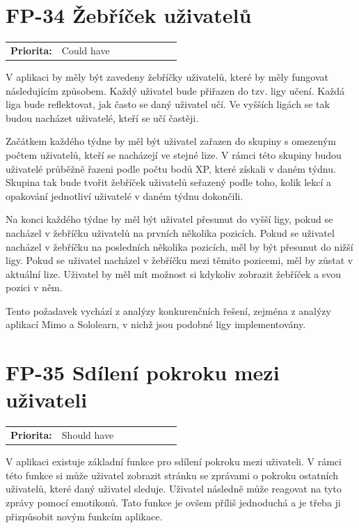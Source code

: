 \section{FP-34 Žebříček uživatelů}\label{sec:fp-leaderboard}

\begin{tabular}{lp{0.7\linewidth}}
    \textbf{Priorita:} & Could have \\
\end{tabular}

V aplikaci by měly být zavedeny žebříčky uživatelů, které by měly fungovat následujícím způsobem. Každý uživatel bude přiřazen do tzv. ligy učení. Každá liga bude reflektovat, jak často se daný uživatel učí. Ve vyšších ligách se tak budou nacházet uživatelé, kteří se učí častěji.

Začátkem každého týdne by měl být uživatel zařazen do skupiny s omezeným počtem uživatelů, kteří se nacházejí ve stejné lize. V rámci této skupiny budou uživatelé průběžně řazeni podle počtu bodů XP, které získali v daném týdnu. Skupina tak bude tvořit žebříček uživatelů seřazený podle toho, kolik lekcí a opakování jednotliví uživatelé v daném týdnu dokončili.

Na konci každého týdne by měl být uživatel přesunut do vyšší ligy, pokud se nacházel v žebříčku uživatelů na prvních několika pozicích. Pokud se uživatel nacházel v žebříčku na posledních několika pozicích, měl by být přesunut do nižší ligy. Pokud se uživatel nacházel v žebříčku mezi těmito pozicemi, měl by zůstat v aktuální lize. Uživatel by měl mít možnost si kdykoliv zobrazit žebříček a svou pozici v něm.

Tento požadavek vychází z analýzy konkurenčních řešení, zejména z analýzy aplikací Mimo a Sololearn, v nichž jsou podobné ligy implementovány.

\section{FP-35 Sdílení pokroku mezi uživateli}\label{sec:fp-progress-sharing}

\begin{tabular}{lp{0.7\linewidth}}
    \textbf{Priorita:} & Should have \\
\end{tabular}

V aplikaci existuje základní funkce pro sdílení pokroku mezi uživateli. V rámci této funkce si může uživatel zobrazit stránku se zprávami o pokroku ostatních uživatelů, které daný uživatel sleduje. Uživatel následně může reagovat na tyto zprávy pomocí emotikonů. Tato funkce je ovšem příliš jednoduchá a je třeba ji přizpůsobit novým funkcím aplikace.

